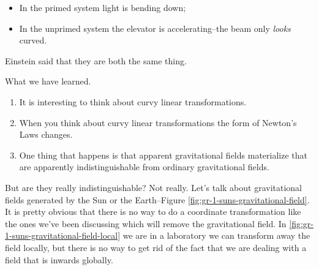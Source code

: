 \documentclass[]{article}
\begin{document}
\begin{itemize}
	\item In the primed system light is bending down;
	\item In the unprimed system the elevator is accelerating--the beam only \emph{looks} curved.
\end{itemize}

Einstein said that they are both the same thing.

What we have learned. 

\begin{enumerate}
	\item It is interesting to think about curvy linear transformations. 
	\item When you think about curvy linear transformations the form of Newton's Laws changes.
	\item One thing that happens is that apparent  gravitational fields  materialize that are apparently indistinguishable from ordinary gravitational fields.
\end{enumerate}

But are they really indistinguishable? Not really. Let's talk about gravitational fields generated by the Sun or the Earth--Figure \ref{fig:gr-1-suns-gravitational-field}. It is pretty obvious that there is no way to do a coordinate transformation like the ones we've been discussing which will remove the gravitational field. In \ref{fig:gr-1-suns-gravitational-field-local} we are in a laboratory we can transform away the field locally,  but there is no way to get rid of the fact that we are dealing with a field that is inwards globally.
\end{document}
